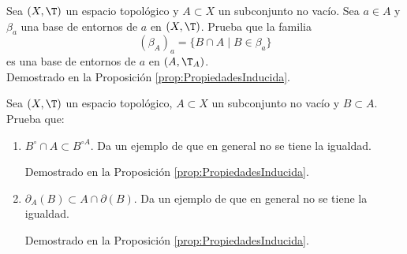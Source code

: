\begin{ejercicio}
    Sea $(X,\T)$ un espacio topológico y $A\subset X$ un subconjunto no vacío. Sea $a\in A$ y $\beta_a$ una base de entornos de $a$ en $(X,\T)$. Prueba que la familia
    \begin{equation*}
        (\beta_A)_a = \{B\cap A\mid B\in \beta_a\}
    \end{equation*}
    es una base de entornos de $a$ en $(A,\T_A)$.\\

    Demostrado en la Proposición \ref{prop:PropiedadesInducida}.
\end{ejercicio}

\begin{ejercicio}
    Sea $(X,\T)$ un espacio topológico, $A\subset X$ un subconjunto no vacío y $B\subset A$. Prueba que:
    \begin{enumerate}
        \item $B^\circ \cap A \subset B^{\circ A}$. Da un ejemplo de que en general no se tiene la igualdad.

        Demostrado en la Proposición \ref{prop:PropiedadesInducida}.
            
        \item $\partial_A(B)\subset A\cap \partial(B)$. Da un ejemplo de que en general no se tiene la igualdad.

        Demostrado en la Proposición \ref{prop:PropiedadesInducida}.
    \end{enumerate}
\end{ejercicio}


